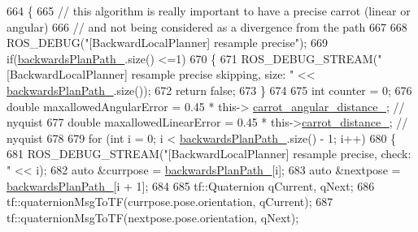 \begin{DoxyCode}
664         \{
665             \textcolor{comment}{// this algorithm is really important to have a precise carrot (linear or angular)}
666             \textcolor{comment}{// and not being considered as a divergence from the path}
667 
668             ROS\_DEBUG(\textcolor{stringliteral}{"[BackwardLocalPlanner] resample precise"});
669             \textcolor{keywordflow}{if}(\hyperlink{classcl__move__base__z_1_1backward__local__planner_1_1BackwardLocalPlanner_ad9cde5c85f782cab2ddb4030e3c3f2cf}{backwardsPlanPath\_}.size() <=1)
670             \{
671                 ROS\_DEBUG\_STREAM(\textcolor{stringliteral}{"[BackwardLocalPlanner] resample precise skipping, size: "} << 
      \hyperlink{classcl__move__base__z_1_1backward__local__planner_1_1BackwardLocalPlanner_ad9cde5c85f782cab2ddb4030e3c3f2cf}{backwardsPlanPath\_}.size());
672                 \textcolor{keywordflow}{return} \textcolor{keyword}{false};
673             \}
674 
675             \textcolor{keywordtype}{int} counter = 0;
676             \textcolor{keywordtype}{double} maxallowedAngularError = 0.45 * this->
      \hyperlink{classcl__move__base__z_1_1backward__local__planner_1_1BackwardLocalPlanner_a63e30befa09c4a67cf55086923b760c7}{carrot\_angular\_distance\_}; \textcolor{comment}{// nyquist}
677             \textcolor{keywordtype}{double} maxallowedLinearError = 0.45 * this->\hyperlink{classcl__move__base__z_1_1backward__local__planner_1_1BackwardLocalPlanner_a0bbb80ce5bae865c4322869422803296}{carrot\_distance\_};          \textcolor{comment}{//
       nyquist}
678 
679             \textcolor{keywordflow}{for} (\textcolor{keywordtype}{int} i = 0; i < \hyperlink{classcl__move__base__z_1_1backward__local__planner_1_1BackwardLocalPlanner_ad9cde5c85f782cab2ddb4030e3c3f2cf}{backwardsPlanPath\_}.size() - 1; i++)
680             \{
681                 ROS\_DEBUG\_STREAM(\textcolor{stringliteral}{"[BackwardLocalPlanner] resample precise, check: "} << i);
682                 \textcolor{keyword}{auto} &currpose = \hyperlink{classcl__move__base__z_1_1backward__local__planner_1_1BackwardLocalPlanner_ad9cde5c85f782cab2ddb4030e3c3f2cf}{backwardsPlanPath\_}[i];
683                 \textcolor{keyword}{auto} &nextpose = \hyperlink{classcl__move__base__z_1_1backward__local__planner_1_1BackwardLocalPlanner_ad9cde5c85f782cab2ddb4030e3c3f2cf}{backwardsPlanPath\_}[i + 1];
684 
685                 tf::Quaternion qCurrent, qNext;
686                 tf::quaternionMsgToTF(currpose.pose.orientation, qCurrent);
687                 tf::quaternionMsgToTF(nextpose.pose.orientation, qNext);

\end{DoxyCode}
